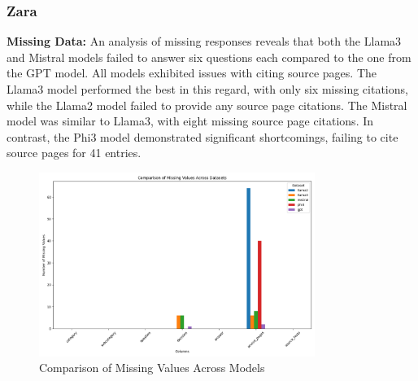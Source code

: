 \documentclass[]{article}
\begin{document}
\subsubsection{Zara}
\textbf{Missing Data:} An analysis of missing responses reveals that both the Llama3 and 
Mistral models failed to answer six questions each compared to the one from the GPT model. 
All models exhibited issues with citing source pages. 
The Llama3 model performed the best in this regard, with only six missing citations, 
while the Llama2 model failed to provide any source page citations. The Mistral model was similar to Llama3, 
with eight missing source page citations. In contrast, the Phi3 model demonstrated significant shortcomings, 
failing to cite source pages for 41 entries.

\begin{figure}[H]
    \centering
    \includegraphics[width=0.8\textwidth]{./images/Missing_Values.png}
    \caption{Comparison of Missing Values Across Models}
    \label{fig:image_label}
\end{figure}
\end{document}
